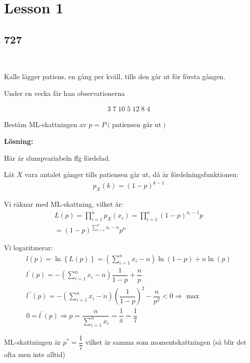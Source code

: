 \section{Lesson 1}\par
\subsection{727}\hfill\\\par
\noindent Kalle lägger patiens, en gång per kväll, tills den går ut för första gången.\par
\noindent Under en vecka får han observationerna

\begin{equation*}
  \begin{gathered}
  3\; 7\; 10\; 5\; 12\; 8\; 4 
  \end{gathered}
\end{equation*}\par
\noindent Bestäm ML-skattningen av $p = P(\text{patiensen går ut})$
\par\bigskip
\noindent\textbf{Lösning:}\par
\noindent Här är slumpvariabeln ffg fördelad.\par
\noindent Låt $X$ vara antalet gånger tills patiensen går ut, då är fördelningsfunktionen:
\begin{equation*}
  \begin{gathered}
    p_X(k) = (1-p)^{k-1}
  \end{gathered}
\end{equation*}
\par\bigskip
\noindent Vi räknar med ML-skattning, vilket är:
\begin{equation*}
  \begin{gathered}
    L(p) = \prod_{i=1}^{n}p_X(x_i) = \prod_{i=1}^{n}(1-p)^{x_i-1}p\\
    = (1-p)^{\sum_{i=1}^{n}x_i-n}p^n
  \end{gathered}
\end{equation*}
\par\bigskip
\noindent Vi logaritmerar:
\begin{equation*}
  \begin{gathered}
  l(p) = \ln\left\{L(p)\right\} = (\sum_{i=1}^{n}x_i-n)\ln(1-p)+n\ln(p)\\
  l^{\prime}(p) = -\left(\sum_{i=1}^{n}x_i-n\right)\dfrac{1}{1-p} + \dfrac{n}{p}\\
  l^{\prime\prime}(p) = -\left(\sum_{i=1}^{n}x_i-n\right)\left(\dfrac{1}{1-p}\right)^2-\dfrac{n}{p^2}<0\Rightarrow\text{ max}\\
  0 = l^{\prime}(p) \Rightarrow p = \dfrac{n}{\sum_{i=1}^{n}x_i} = \dfrac{1}{\overline{x}} = \dfrac{1}{7}
  \end{gathered}
\end{equation*}
\par\bigskip
\noindent ML-skattningen är $p^* = \dfrac{1}{7}$ vilket är samma som momentskattningen (så blir det ofta men inte alltid)
\par\bigskip

